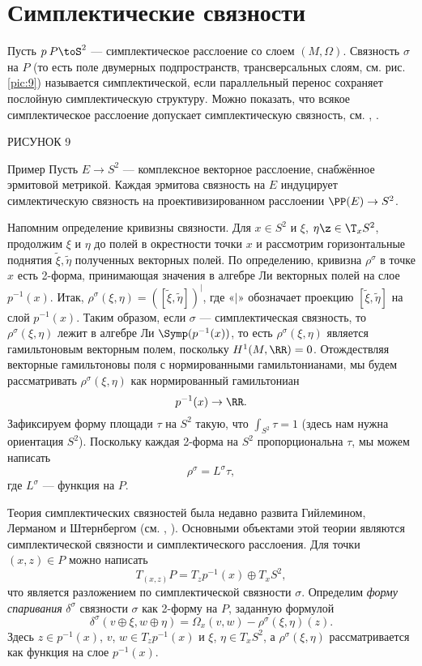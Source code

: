 \section{Симплектические связности}

Пусть $p\: P\toS^2$ --- симплектическое расслоение со слоем $(M,\Omega)$.
Связность $\sigma$ на $P$ (то есть поле двумерных подпространств, трансверсальных слоям, см. рис. \ref{pic:9}) называется симплектической, если параллельный перенос сохраняет послойную симплектическую структуру.
Можно показать, что всякое симплектическое расслоение допускает симплектическую связность, см. \cite{GLS}, \cite{MS}.

РИСУНОК 9 

\begin{thm*}{Пример}
Пусть $E \to S^2$ --- комплексное векторное расслоение, снабжённое эрмитовой метрикой.
Каждая эрмитова связность на $E$ индуцирует симлектическую связность на проективизированном расслоении $\PP(E) \to S^2$.
\end{thm*}

Напомним определение кривизны связности.
Для $x \in S^2$ и $\xi$, $\eta \z\in \T_x S^2$, продолжим $\xi$ и $\eta$ до полей в окрестности точки $x$ и рассмотрим горизонтальные поднятия $\tilde\xi, \tilde\eta$ полученных векторных полей.
По определению, кривизна $\rho^\sigma$ в точке $x$ есть 2-форма, принимающая значения в алгебре Ли векторных полей на слое $p^{-1} (x)$.
Итак, $\rho^\sigma (\xi, \eta) = ([\tilde\xi, \tilde\eta])^\vert$, где «$\vert$» обозначает проекцию $[\tilde\xi, \tilde\eta]$ на слой $p^{-1} (x)$.
Таким образом, если $\sigma$ --- симплектическая связность, то $\rho^\sigma (\xi, \eta)$ лежит в алгебре Ли $\Symp(p^{-1} (x))$, то есть $\rho^\sigma (\xi, \eta)$ является гамильтоновым векторным полем, поскольку $H^1 (M, \RR) = 0$.
Отождествляя векторные гамильтоновы поля с нормированными гамильтонианами, мы будем рассматривать $\rho^\sigma (\xi, \eta)$ как нормированный гамильтониан
\[p^{-1} (x) \to \RR.\]
Зафиксируем форму площади $\tau$ на $S^2$ такую, что $\int_{S^2} \tau = 1$ (здесь нам нужна ориентация $S^2$).
Поскольку каждая 2-форма на $S^2$ пропорциональна $\tau$, мы можем написать 
\[\rho^\sigma = L^\sigma \tau,\]
где $L^\sigma$ --- функция на $P$.

Теория симплектических связностей была недавно развита Гийлемином, Лерманом и Штернбергом (см. \cite{GLS}, \cite{MS}).
Основными объектами этой теории являются  симплектической связности и  симплектического расслоения.
Для точки $(x, z) \in P$ можно написать 
\[T_{(x,z)} P = T_z p^{-1} (x) \oplus T_x S^2,\]
что является разложением по симплектической связности $\sigma$.
Определим \emph{форму спаривания} $\delta^\sigma$ связности $\sigma$ как 2-форму на $P$, заданную формулой 
\[\delta^\sigma (v \oplus \xi, w \oplus \eta) = \Omega_x (v, w) - \rho^\sigma (\xi, \eta)(z).\]
Здесь $z \in p^{-1} (x)$, $v$, $w \in T_z p^{-1} (x)$ и $\xi$, $\eta \in T_x S^2$, а $\rho^\sigma (\xi, \eta)$ рассматривается как функция на слое $p^{-1} (x)$.


